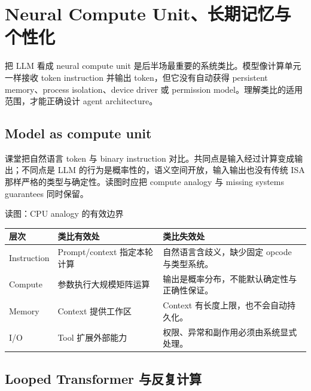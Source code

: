\section{Neural Compute Unit、长期记忆与个性化}

把 LLM 看成 neural compute unit 是后半场最重要的系统类比。模型像计算单元一样接收 token instruction 并输出 token，但它没有自动获得 persistent memory、process isolation、device driver 或 permission model。理解类比的适用范围，才能正确设计 agent architecture。

\subsection{Model as compute unit}

课堂把自然语言 token 与 binary instruction 对比。共同点是输入经过计算变成输出；不同点是 LLM 的行为是概率性的，语义空间开放，输入输出也没有传统 ISA 那样严格的类型与确定性。读图时应把 compute analogy 与 missing systems guarantees 同时保留。


\begin{knowledgebox}{读图：CPU analogy 的有效边界}
\begin{tabularx}{\textwidth}{L{0.22\textwidth} L{0.32\textwidth} >{\raggedright\arraybackslash}X}
\toprule
层次 & 类比有效处 & 类比失效处 \\
\midrule
Instruction & Prompt/context 指定本轮计算 & 自然语言含歧义，缺少固定 opcode 与类型系统。 \\
Compute & 参数执行大规模矩阵运算 & 输出是概率分布，不能默认确定性与正确性保证。 \\
Memory & Context 提供工作区 & Context 有长度上限，也不会自动持久化。 \\
I/O & Tool 扩展外部能力 & 权限、异常和副作用必须由系统显式处理。 \\
\bottomrule
\end{tabularx}
\end{knowledgebox}


\subsection{Looped Transformer 与反复计算}


